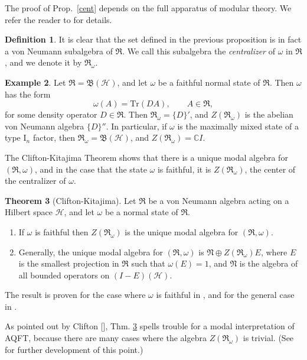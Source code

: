 \documentclass[12pt]{article}
\newcommand{\alg}[1]{\mathfrak{#1}}
\newcommand{\bh}{\mathfrak{B}(\mathcal{H})}
\theoremstyle{definition}
\newtheorem{thm}{Theorem}[section]
\theoremstyle{definition}
\newtheorem{defn}[thm]{Definition}
\newtheorem{example}[thm]{Example}
\theoremstyle{remark}
\def\2#1{{\mathcal #1}}
\def\7#1{{\mathbb #1}}
\def\al#1{{\mathfrak #1}}
\def\om{\omega} \def\Om{\Omega} \def\dd{\partial} \def\D{\Delta}
\newcommand{\tr}{\mathrm{Tr}}
\begin{document}
The proof of Prop.\ \ref{cent} depends on the full apparatus of
modular theory.  We refer the reader to \cite[Chap. 8]{tak2} for
details.

\begin{defn} It is clear that the set defined in the previous
  proposition is in fact a von Neumann subalgebra of $\alg{R}$.  We
  call this subalgebra the \emph{centralizer} of $\om$ in $\alg{R}$,
  and we denote it by $\al R_\om$.
\end{defn}

\begin{example} Let $\al R=\bh$, and let $\om$ be a faithful normal
  state of $\al R$.  Then $\om$ has the form
$$ \om (A)=\tr
(DA),\qquad A\in \al R ,$$ for some density operator $D\in \al R$.
Then $\al R_\om = \{ D\}'$, and $Z(\al R_\om )$ is the abelian von
Neumann algebra $\{ D\}''$.  In particular, if $\om$ is the maximally
mixed state of a type I$_n$ factor, then $\al R_\om =\bh$, and $Z(\al
R_\om )=\7C I$.
\end{example}

The Clifton-Kitajima Theorem shows that there is a unique modal
algebra for $(\alg{R},\om )$, and in the case that the state $\om$ is
faithful, it is $Z(\al R_\om )$, the center of the centralizer of
$\om$.

\begin{thm}[Clifton-Kitajima] Let $\alg{R}$ be a von Neumann algebra
  acting on a Hilbert space $\2H$, and let $\om$ be a normal state of
  $\alg{R}$.
  \begin{enumerate} \item If $\om$ is faithful then $Z(\al R_\om )$ is
    the unique modal algebra for $(\alg{R} ,\om )$.
  \item Generally, the unique modal algebra for $(\alg{R},\om )$ is
    $\alg{N}\oplus Z(\al R_\om )E$, where $E$ is the smallest
    projection in $\al R$ such that $\om (E)=1$, and $\al N$ is the
    algebra of all bounded operators on $(I-E)(\2H)$.
  \end{enumerate}
  \label{kitty}
\end{thm}

\noindent The result is proven for the case where $\om$ is faithful in
\cite{cli9}, and for the general case in \cite{kit}.

As pointed out by Clifton [\citeyear{cli9}], Thm. \ref{kitty} spells
trouble for a modal interpretation of AQFT, because there are many
cases where the algebra $Z(\al R_\om )$ is trivial.  (See
\cite{rue-ear} for further development of this point.)
\end{document}
